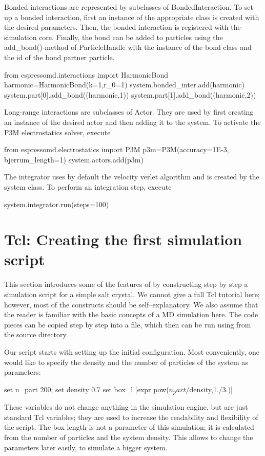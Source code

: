 Bonded interactions are represented by subclasses of BondedInteraction. To set up a bonded interaction, first an instance of the appropriate class is created with the desired parameters. Then, the bonded interaction is registered with the simulation core. Finally, the bond can be added to particles using the add_bond()-method of ParticleHandle with the instance of the bond class and the id of the bond partner particle. 
\begin{pypresso}
from espressomd.interactions import HarmonicBond
harmonic=HarmonicBond(k=1,r_0=1)
system.bonded_inter.add(harmonic)
system.part[0].add_bond((harmonic,1))
system.part[1].add_bond((harmonic,2))
\end{pypresso}

Long-range interactions are subclasses of Actor. They are used by first creating an instance of the desired actor and then adding it to the system.
To activate the P3M electrostatics solver, execute
\begin{pypresso}
from espressomd.electrostatics import P3M
p3m=P3M(accuracy=1E-3, bjerrum_length=1)
system.actors.add(p3m)
\end{pypresso}

The integrator uses by default the velocity verlet algorithm and is created by the system class.
To perform an integration step, execute
\begin{pypresso}
system.integrator.run(steps=100)
\end{pypresso}

\section{Tcl: Creating the first simulation script}

This section introduces some of the features of \es by constructing
step by step a simulation script for a simple salt crystal.  We cannot
give a full Tcl tutorial here; however, most of the constructs should
be self--explanatory. We also assume that the reader is familiar with
the basic concepts of a MD simulation here. The code pieces can be
copied step by step into a file, which then can be run using
 from the \es source directory.

Our script starts with setting up the initial configuration.  Most
conveniently, one would like to specify the density and the number of
particles of the system as parameters:
\begin{tclcode}
set n_part 200; set density 0.7
set box_l [expr pow($n_part/$density,1./3.)]
\end{tclcode}
These variables do not change anything in the simulation engine, but
are just standard Tcl variables; they are used to increase the
readability and flexibility of the script. The box length is not a
parameter of this simulation; it is calculated from the number of
particles and the system density. This allows to change the parameters
later easily, \eg to simulate a bigger system.

